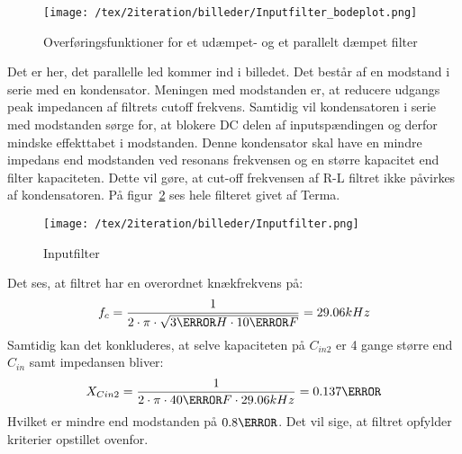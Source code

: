 \begin{figure}[H]
	\center
	\texttt{[image: /tex/2iteration/billeder/Inputfilter\_bodeplot.png]}
	\caption{Overføringsfunktioner for et udæmpet- og et parallelt dæmpet filter}
	\label{fig:Inputfilter_bodeplot}
\end{figure}    

Det er her, det parallelle led kommer ind i billedet. Det består af en modstand i serie med en kondensator. Meningen med modstanden er, at reducere udgangs peak impedancen af filtrets cutoff frekvens. Samtidig vil kondensatoren i serie med modstanden sørge for, at blokere DC delen af inputspændingen og derfor mindske effekttabet i modstanden. Denne kondensator skal have en mindre impedans end modstanden ved resonans frekvensen og en større kapacitet end filter kapaciteten. Dette vil gøre, at cut-off frekvensen af R-L filtret ikke påvirkes af kondensatoren. På figur~\ref{fig: Inputfilter} ses hele filteret givet af Terma.    
\begin{figure}[H]
	\center
	\texttt{[image: /tex/2iteration/billeder/Inputfilter.png]}
	\caption{Inputfilter}
	\label{fig: Inputfilter}
\end{figure}

\noindent Det ses, at filtret har en overordnet knækfrekvens på:
\begin{equation} \label{fc}
f_c = \frac{1}{2 \cdot \pi \cdot \sqrt{3\micro H \cdot 10\micro F}} = 29.06kHz
\end{equation}
Samtidig kan det konkluderes, at selve kapaciteten på $C_{in2}$ er 4 gange større end $C_{in}$ samt impedansen bliver:
\begin{equation} \label{XC2}
X_{Cin2} = \frac{1}{2 \cdot \pi \cdot 40\micro F \cdot 29.06kHz} = 0.137\ohm
\end{equation}
Hvilket er mindre end modstanden på $0.8\ohm$. Det vil sige, at filtret opfylder kriterier opstillet ovenfor.